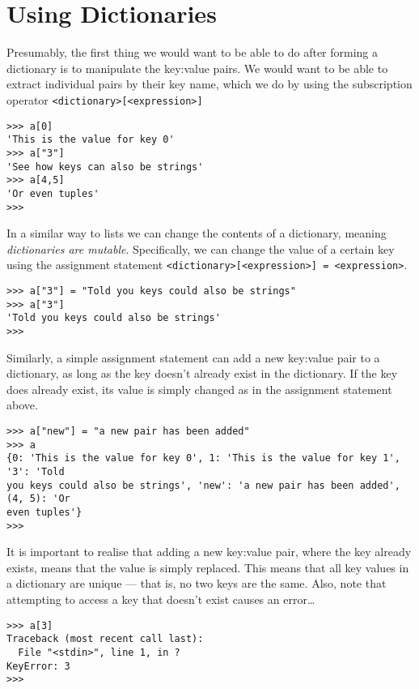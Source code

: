 \section{Using Dictionaries}

Presumably, the first thing we would want to be able to do after   forming a dictionary is to manipulate the key:value pairs. We would   want to be able to extract individual pairs by their key name, which we   do by using the subscription operator   
\texttt{<dictionary>[<expression>]}
\lstset{keywordstyle=\ttfamily}
\begin{lstlisting}
>>> a[0]
'This is the value for key 0'
>>> a["3"]
'See how keys can also be strings'
>>> a[4,5]
'Or even tuples'
>>>
\end{lstlisting}
\lstset{keywordstyle=\textbf}

In a similar way to lists we can change the contents of a   dictionary, meaning \textit{dictionaries are mutable}.   Specifically, we can change the value of a certain key using the   assignment statement 
\texttt{<dictionary>[<expression>] =   <expression>}.
\begin{lstlisting}
>>> a["3"] = "Told you keys could also be strings"
>>> a["3"]
'Told you keys could also be strings'
>>>
\end{lstlisting}

Similarly, a simple assignment statement can add a new key:value   pair to a dictionary, as long as the key doesn't already exist in the   dictionary. If the key does already exist, its value is simply changed   as in the assignment statement above.
\lstset{keywordstyle=\ttfamily}
\begin{lstlisting}
>>> a["new"] = "a new pair has been added"
>>> a
{0: 'This is the value for key 0', 1: 'This is the value for key 1', '3': 'Told
you keys could also be strings', 'new': 'a new pair has been added', (4, 5): 'Or
even tuples'}
>>>
\end{lstlisting}
\lstset{keywordstyle=\textbf}

It is important to realise that adding a new key:value pair, where the key already exists, means that the value is simply replaced. This means that all key values in a dictionary are unique --- that is, no two keys are the same. Also, note   that attempting to access a key that doesn't exist causes an   error\ldots
\lstset{keywordstyle=\ttfamily}
\begin{lstlisting}
>>> a[3]
Traceback (most recent call last):
  File "<stdin>", line 1, in ?
KeyError: 3
>>>
\end{lstlisting}
\lstset{keywordstyle=\textbf}

